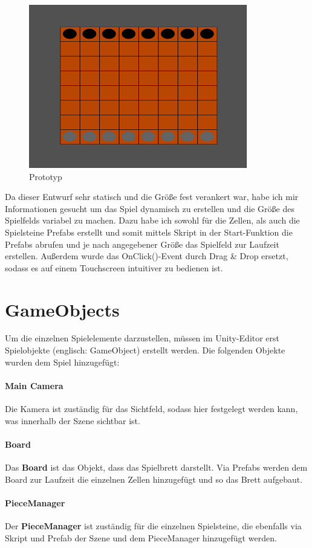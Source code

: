 \begin{figure}[h]
	\centering
	\includegraphics{img/Prototyp}
	\caption{Prototyp}
	\label{fig:Prototyp}
\end{figure}

Da dieser Entwurf sehr statisch und die Größe fest verankert war, habe ich mir Informationen gesucht um das Spiel dynamisch zu erstellen und die Größe des Spielfelds variabel zu machen. Dazu habe ich sowohl für die Zellen, als auch die Spielsteine Prefabs erstellt und somit mittels Skript in der Start-Funktion die Prefabs abrufen und je nach angegebener Größe das Spielfeld zur Laufzeit erstellen.
Außerdem wurde das OnClick()-Event durch Drag \& Drop ersetzt, sodass es auf einem Touchscreen intuitiver zu bedienen ist.
\section{GameObjects}
\label{ch:Implementierung:sec:GameObjects}
Um die einzelnen Spielelemente darzustellen, müssen im Unity-Editor erst Spielobjekte (englisch: GameObject) erstellt werden. Die folgenden Objekte wurden dem Spiel hinzugefügt:
\paragraph{Main Camera}
Die Kamera ist zuständig für das Sichtfeld, sodass hier festgelegt werden kann, was innerhalb der Szene sichtbar ist.
\paragraph{Board}
Das \textbf{Board} ist das Objekt, dass das Spielbrett darstellt. Via Prefabs werden dem Board zur Laufzeit die einzelnen Zellen hinzugefügt und so das Brett aufgebaut.
\paragraph{PieceManager}
Der \textbf{PieceManager} ist zuständig für die einzelnen Spielsteine, die ebenfalls via Skript und Prefab der Szene und dem PieceManager hinzugefügt werden.
